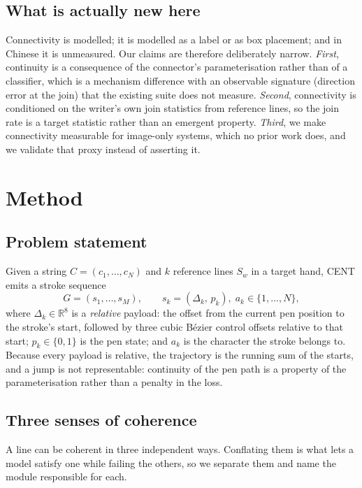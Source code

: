 \documentclass[conference]{IEEEtran}
\begin{document}
\subsection{What is actually new here}
Connectivity is modelled; it is modelled as a label or as box placement; and in Chinese it is
unmeasured. Our claims are therefore deliberately narrow. \emph{First}, continuity is a
consequence of the connector's parameterisation rather than of a classifier, which is a
mechanism difference with an observable signature (direction error at the join) that the
existing suite does not measure. \emph{Second}, connectivity is conditioned on the writer's
own join statistics from reference lines, so the join rate is a target statistic rather than
an emergent property. \emph{Third}, we make connectivity measurable for image-only systems,
which no prior work does, and we validate that proxy instead of asserting it.

\section{Method}\label{sec:method}

\subsection{Problem statement}
Given a string $C=(c_1,\dots,c_N)$ and $k$ reference lines $S_w$ in a target hand, CENT emits a
stroke sequence
\begin{equation}
G=(s_1,\dots,s_M),\qquad s_k=(\Delta_k,\,p_k),\; a_k\in\{1,\dots,N\},
\end{equation}
where $\Delta_k\in\mathbb{R}^{8}$ is a \emph{relative} payload: the offset from the current pen
position to the stroke's start, followed by three cubic B\'ezier control offsets relative to
that start; $p_k\in\{0,1\}$ is the pen state; and $a_k$ is the character the stroke belongs to.
Because every payload is relative, the trajectory is the running sum of the starts, and a jump
is not representable: continuity of the pen path is a property of the parameterisation rather
than a penalty in the loss.

\subsection{Three senses of coherence}
A line can be coherent in three independent ways. Conflating them is what lets a model satisfy
one while failing the others, so we separate them and name the module responsible for each.
\end{document}
